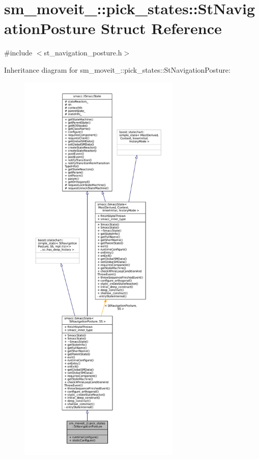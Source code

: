 \hypertarget{structsm__moveit__2_1_1pick__states_1_1StNavigationPosture}{}\section{sm\+\_\+moveit\+\_\+:\+:pick\+\_\+states\+:\+:St\+Navigation\+Posture Struct Reference}
\label{structsm__moveit__2_1_1pick__states_1_1StNavigationPosture}


{\ttfamily \#include $<$st\+\_\+navigation\+\_\+posture.\+h$>$}



Inheritance diagram for sm\+\_\+moveit\+\_\+:\+:pick\+\_\+states\+:\+:St\+Navigation\+Posture\+:
\nopagebreak
\begin{figure}[H]
\begin{center}
\leavevmode
\includegraphics[height=550pt]{structsm__moveit__2_1_1pick__states_1_1StNavigationPosture__inherit__graph}
\end{center}
\end{figure}


